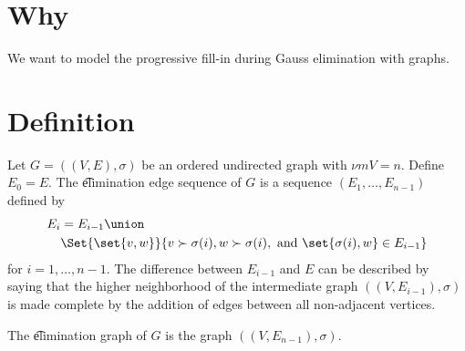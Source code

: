 

\section*{Why}

We want to model the progressive fill-in during Gauss elimination with graphs.

\section*{Definition}

Let $G = ((V, E), \sigma )$ be an ordered undirected graph with $\nu m{V} = n$.
Define $E_0 = E$.
The \t{elimination edge sequence} of $G$ is a sequence $(E_1, \dots , E_{n-1})$ defined by
\[
\begin{aligned}
E_i & = E_{i-1} \union \\ &\Set{\set{v, w}}{v \succ \sigma (i), w \succ \sigma (i), \text{ and } \set{\sigma (i), w} \in E_{i-1}}
\end{aligned}
\]
for $i = 1, \dots , n-1$.
The difference between $E_{i-1}$ and $E$ can be described by saying that the higher neighborhood of the intermediate graph $((V, E_{i-1}), \sigma )$ is made complete by the addition of edges between all non-adjacent vertices.

The \t{elimination graph} of $G$ is the graph $((V, E_{n-1}), \sigma )$.

\blankpage